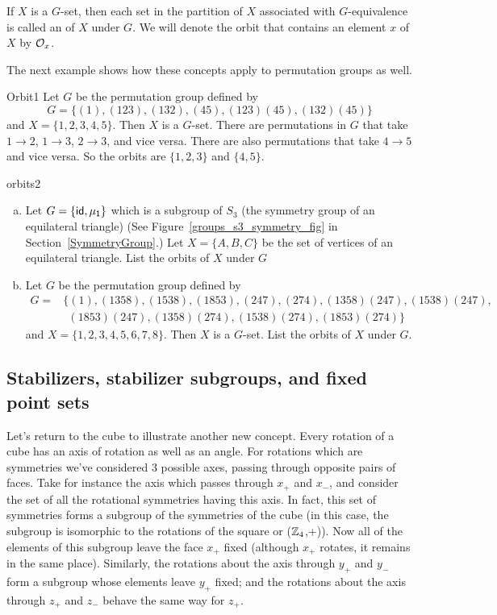 \begin{defn} \label{noteorbit}
If $X$ is a $G$-set, then each set in the partition of $X$ associated with
$G$-equivalence is called an  of $X$ under $G$. We will denote the orbit that contains an element $x$ of $X$ by
${\cal O}_x$. 
\end {defn}
The next example shows how these concepts apply to permutation groups as well.

\begin{example}{Orbit1}
Let $G$ be the permutation group defined by
\[
G =\{(1), (1 23), (1 3 2), (4 5), (1 2 3)(4 5), (1 3 2)(4 5) \}
\]
and $X = \{ 1, 2, 3, 4, 5\}$. Then $X$ is a $G$-set. There are permutations in $G$ that take $1\rightarrow2$, $1\rightarrow3$, $2\rightarrow3$, and vice versa. There are also permutations that take $4\rightarrow 5$ and vice versa.  So the orbits are $\{1, 2, 3\}$ and $\{4, 5\}$. 
\end{example} 
 
\begin{exercise}{orbits2}
\begin{enumerate}[(a)]
\item Let $G=\{\sf{id},\mu_1\}$ which is a subgroup of $S_3$ (the symmetry group of an equilateral triangle) (See Figure~\ref{groups_s3_symmetry_fig} in Section~\ref{SymmetryGroup}.) Let $X=\{A,B,C\}$ be the set of vertices of an equilateral triangle. List the orbits of $X$ under $G$
\item Let $G$ be the permutation group defined by
\begin{align*}
G =&\{(1), (1358),(1538), (1853), (247),(274), (1358)(247),(1538)(247),\\
&~~ (1853)(247),(1358)(274),(1538)(274),(1853)(274) \}
\end{align*}
and $X = \{ 1, 2, 3, 4, 5,6,7,8\}$. Then $X$ is a $G$-set.  List the orbits of $X$ under $G$.
\end{enumerate}
\end {exercise}


\subsection{Stabilizers, stabilizer subgroups, and fixed point sets}

 Let's return to the cube to illustrate another new concept. Every rotation of a cube has an axis of rotation as well as an angle.   
 For rotations which are symmetries we've considered 3 possible axes, passing through opposite pairs of faces. 
Take for instance the axis which passes through $x_+$ and $x_-$, and consider the set of all the rotational symmetries having this axis.
In fact, this set of symmetries forms a subgroup  of the symmetries of the cube (in this case, the subgroup is isomorphic to the rotations of the square or ($\mathbb{Z}_4$,+)). Now all of the elements of this subgroup leave the face  $x_+$ fixed (although $x_+$ rotates, it remains in the same place).
Similarly, the rotations about the axis through $y_+$ and $y_-$ form a subgroup whose elements leave  $y_+$ fixed; and the rotations about the axis through $z_+$ and $z_-$ behave the same way for $z_+$.  

